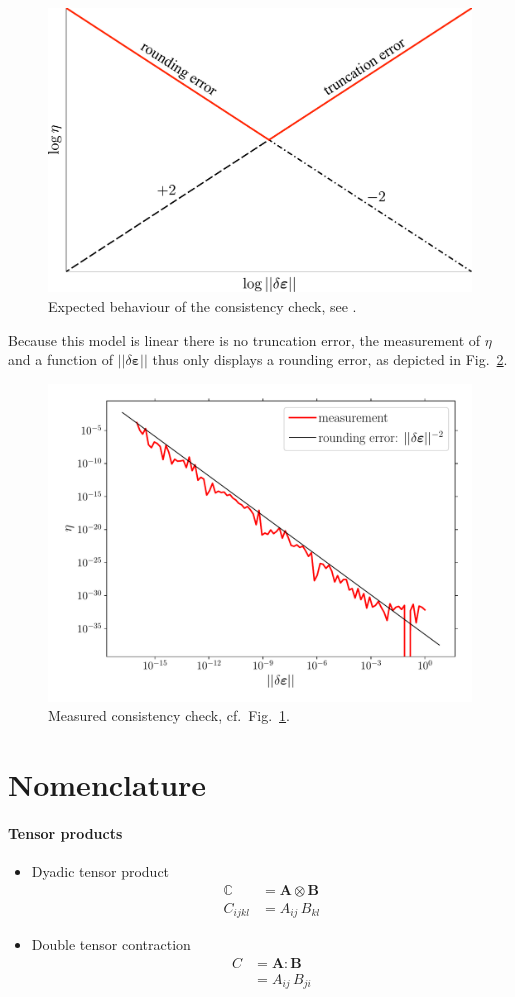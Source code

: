 \documentclass{goose-article}
\begin{document}
\begin{figure}[htp]
  \centering
  \includegraphics[width=.5\textwidth]{figures/consistency}
  \caption{Expected behaviour of the consistency check, see \citet[p.~9]{Heath2002}.}
  \label{fig:consistency:expected}
\end{figure}

Because this model is linear there is no truncation error, the measurement of $\eta$ and a function of $|| \delta \bm{\varepsilon} ||$ thus only displays a rounding error, as depicted in Fig.~\ref{fig:consistency}.

\begin{figure}[htp]
  \centering
  \includegraphics[width=.5\textwidth]{examples/consistency}
  \caption{Measured consistency check, cf.\ Fig.~\ref{fig:consistency:expected}.}
  \label{fig:consistency}
\end{figure}

\appendix

\section{Nomenclature}
\label{sec:ap:nomenclature}

\paragraph{Tensor products}
\vspace*{.5eM}

\begin{itemize}
%
\item Dyadic tensor product
\begin{align}
  \mathbb{C} &= \bm{A} \otimes \bm{B} \\
  C_{ijkl}   &= A_{ij} \,      B_{kl}
\end{align}
%
\item Double tensor contraction
\begin{align}
  C &= \bm{A} : \bm{B} \\
    &= A_{ij} \, B_{ji}
\end{align}
%
\end{itemize}
\end{document}
